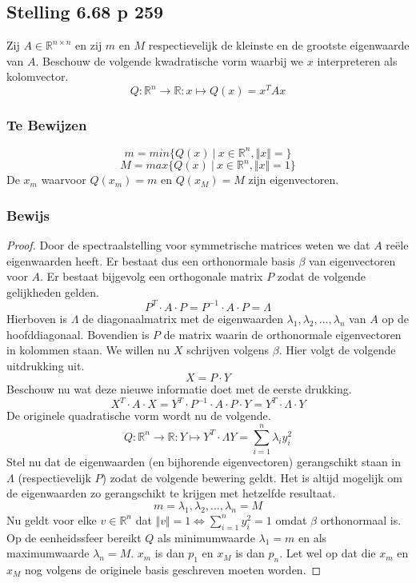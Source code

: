 \documentclass[lineaire_algebra_oplossingen.tex]{subfiles}
\begin{document}
\subsection{Stelling 6.68 p 259}
Zij $A \in \mathbb{R}^{n\times n}$ en zij $m$ en $M$ respectievelijk de kleinste en de grootste eigenwaarde van $A$.
Beschouw de volgende kwadratische vorm  waarbij we $x$ interpreteren als kolomvector.
\[
Q:\mathbb{R}^n \rightarrow \mathbb{R}:x \mapsto Q(x) = x^TAx
\]

\subsubsection*{Te Bewijzen}
\[
m = min\{ Q(x)\ |\ x \in \mathbb{R}^n, \Vert x\Vert = \}
\]
\[
M = max\{ Q(x)\ |\ x \in \mathbb{R}^n, \Vert x\Vert = 1\}
\]
De $x_m$ waarvoor $Q(x_m)=m$ en $Q(x_M)=M$ zijn eigenvectoren. 

\subsubsection*{Bewijs}
\begin{proof}
Door de spectraalstelling voor symmetrische matrices weten we dat $A$ re\"ele eigenwaarden heeft.
Er bestaat dus een orthonormale basis $\beta$ van eigenvectoren voor $A$.
Er bestaat bijgevolg een orthogonale matrix $P$ zodat de volgende gelijkheden gelden.
\[
P^T\cdot A\cdot P = P^{-1}\cdot A\cdot P = \Lambda
\]
Hierboven is $\Lambda$ de diagonaalmatrix met de eigenwaarden $\lambda_1,\lambda_2,...,\lambda_n$ van $A$ op de hoofddiagonaal.
Bovendien is $P$ de matrix waarin de orthonormale eigenvectoren in kolommen staan.
We willen nu $X$ schrijven volgens $\beta$. Hier volgt de volgende uitdrukking uit.
\[
X = P\cdot Y
\]
Beschouw nu wat deze nieuwe informatie doet met de eerste drukking.
\[
X^T\cdot A \cdot X = Y^T\cdot P^{-1}\cdot A\cdot P\cdot Y  = Y^T\cdot \Lambda \cdot Y
\]
De originele quadratische vorm wordt nu de volgende.
\[
Q:\mathbb{R}^n \rightarrow \mathbb{R}: Y \mapsto Y^T\cdot \Lambda Y = \sum_{i=1}^n\lambda_iy_i^2
\]
Stel nu dat de eigenwaarden (en bijhorende eigenvectoren) gerangschikt staan in $\Lambda$ (respectievelijk $P$) zodat de volgende bewering geldt. 
Het is altijd mogelijk om de eigenwaarden zo gerangschikt te krijgen met hetzelfde resultaat.
\[
m=\lambda_1,\lambda_2,...,\lambda_n=M
\]
Nu geldt voor elke $v\in \mathbb{R}^n$ dat $\Vert v\Vert = 1 \Leftrightarrow \sum_{i=1}^ny_i^2 = 1$ omdat $\beta$ orthonormaal is.
Op de eenheidssfeer bereikt $Q$ als minimumwaarde $\lambda_1=m$ en als maximumwaarde $\lambda_n=M$. $x_m$ is dan $p_1$ en $x_M$ is dan $p_n$. Let wel op dat die $x_m$ en $x_M$ nog volgens de originele basis geschreven moeten worden.


\end{proof}
\end{document}
